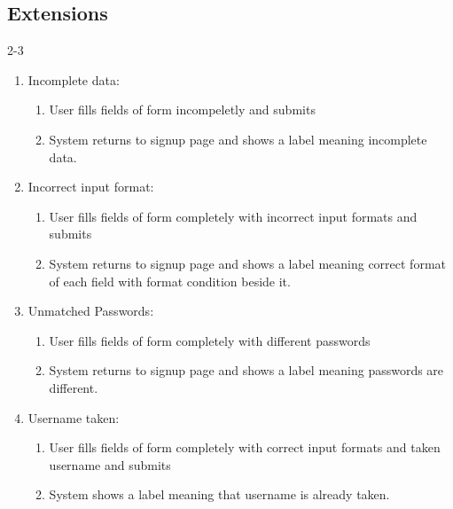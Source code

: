 \documentclass[11pt]{article}
\begin{document}
\subsection{Extensions}
2-3
\begin{enumerate}[label=(\alph*)]
\item
Incomplete data:
\begin{enumerate}[label=(\arabic*)]
\item
User fills fields of form incompeletly and submits
\item
System returns to signup page and shows a label meaning incomplete data.
\end{enumerate}

\item
Incorrect input format:
\begin{enumerate}[label=(\arabic*)]
\item
User fills fields of form completely with incorrect input formats and submits
\item
System returns to signup page and shows a label meaning correct format of each field with format condition beside it.
\end{enumerate}

\item
Unmatched Passwords:
\begin{enumerate}[label=(\arabic*)]
\item
User fills fields of form completely with different passwords
\item
System returns to signup page and shows a label meaning passwords are different.
\end{enumerate}

\item
Username taken:
\begin{enumerate}[label=(\arabic*)]
\item
User fills fields of form completely with correct input formats and taken username and submits
\item
System shows a label meaning that username is already taken.
\end{enumerate}



\end{enumerate}
\end{document}

